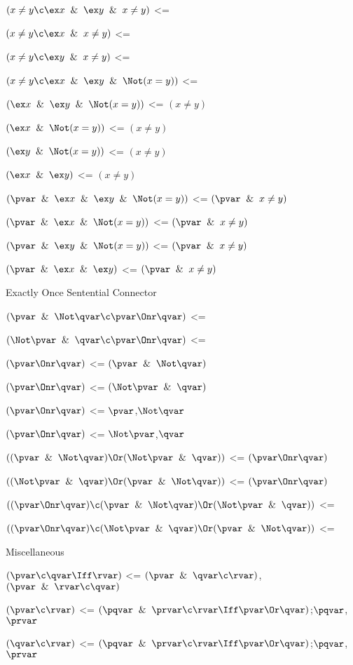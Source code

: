 $(x \ne y \c \ex x \And \ex y \And x \ne y)$ <=

$(x \ne y \c \ex x \And x \ne y)$ <=

$(x \ne y \c \ex y \And x \ne y)$ <=

$(x \ne y \c \ex x \And \ex y \And \Not(x = y))$ <=

$(\ex x \And \ex y \And \Not(x = y))$ <= $(x \ne y)$

$(\ex x \And \Not(x = y))$ <= $(x \ne y)$

$(\ex y \And \Not(x = y))$ <= $(x \ne y)$

$(\ex x \And \ex y )$ <= $(x \ne y)$

$(\pvar \And \ex x \And \ex y \And \Not(x = y))$ <= $(\pvar \And x \ne y)$

$(\pvar \And \ex x \And \Not(x = y))$ <= $(\pvar \And x \ne y)$

$(\pvar \And \ex y \And \Not(x = y))$ <= $(\pvar \And x \ne y)$

$(\pvar \And \ex x \And \ex y )$ <= $(\pvar \And x \ne y)$
\lineb

Exactly Once Sentential Connector
\lineb

$(\pvar \And \Not\qvar \c \pvar \Onr \qvar)$ <=

$(\Not\pvar \And \qvar \c \pvar \Onr \qvar)$ <=

$(\pvar \Onr \qvar)$ <= $(\pvar \And \Not\qvar)$

$(\pvar \Onr \qvar)$ <= $(\Not\pvar \And \qvar)$ 

$(\pvar \Onr \qvar)$ <= $\pvar $,$\Not\qvar$

$(\pvar \Onr \qvar)$ <= $\Not\pvar$,$\qvar$ 

$((\pvar \And \Not\qvar) \Or (\Not\pvar \And \qvar))$ <= $(\pvar \Onr \qvar)$

$((\Not\pvar \And \qvar) \Or (\pvar \And \Not\qvar))$ <= $(\pvar \Onr \qvar)$

$((\pvar \Onr \qvar)\c (\pvar \And \Not\qvar) \Or (\Not\pvar \And \qvar))$ <= 

$((\pvar \Onr \qvar)\c (\Not\pvar \And \qvar) \Or (\pvar \And \Not\qvar))$ <= 

\lineb

Miscellaneous
\lineb

$(\pvar \c \qvar \Iff \rvar)$ <= $(\pvar \And \qvar \c \rvar)$,$(\pvar \And \rvar \c \qvar)$

$(\pvar \c \rvar)$ <= $(\pqvar \And \prvar \c \rvar \Iff \pvar \Or \qvar)$;$\pqvar$,$\prvar$

$(\qvar \c \rvar)$ <= $(\pqvar \And \prvar \c \rvar \Iff \pvar \Or \qvar)$;$\pqvar$,$\prvar$

